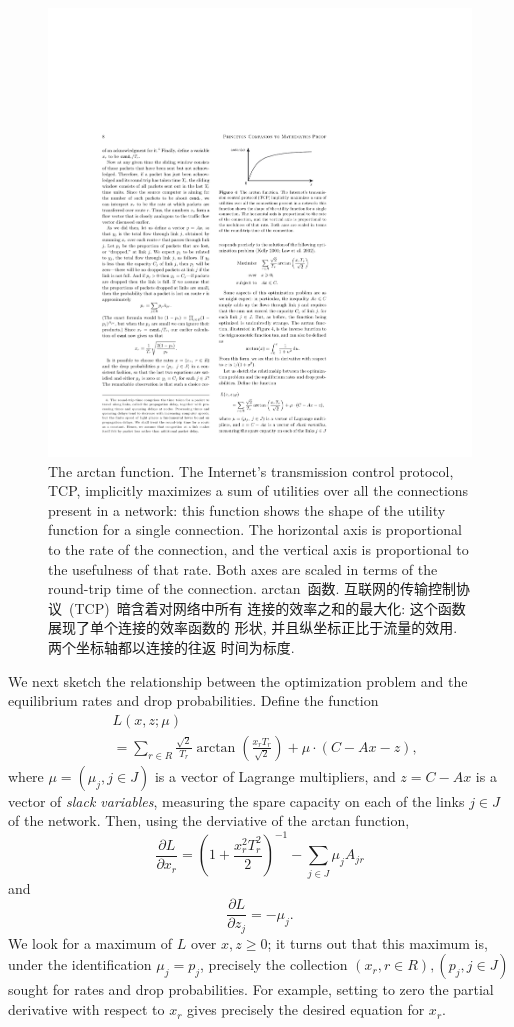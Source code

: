 \documentclass[a4paper,12pt, twocolumn]{article}
\begin{document}
\begin{figure}[ht]
\centering
\includegraphics{p4}
\caption{The arctan function.  The Internet's
transmission control protocol, TCP, implicitly maximizes
a sum of utilities over all the connections present in
a network: this function shows the shape
of the utility function for a single connection.
The horizontal axis is proportional to 
the rate of the connection, and  the vertical
axis is proportional to the usefulness of that rate.  Both axes are
scaled in terms of the round-trip time of the connection. 
arctan~函数. 互联网的传输控制协议~(TCP)~暗含着对网络中所有
连接的效率之和的最大化: 这个函数展现了单个连接的效率函数的
形状, 并且纵坐标正比于流量的效用. 两个坐标轴都以连接的往返
时间为标度. 
\label{Fig-pcm0052.4}}
\end{figure}

We next sketch the relationship between the 
optimization problem and the equilibrium rates and 
drop probabilities.  Define the function
\begin{align*}
&L(x,z  ; \mu )  \\
&=\sum_{r\in R} \frac{\sqrt{2} }{T_r}    
\arctan \left( \frac{x_r T_r}{\sqrt{2} } \right)
+\mu \cdot (C -Ax-z ),
\end{align*}
where $\mu = (\mu_j, j \in J)$ is a vector of Lagrange
multipliers, and $z = C- Ax$ is a vector of {\it slack variables},
measuring the spare capacity on each of the links $j \in J$ of
the network. Then, using the derviative of the arctan function,  
$${{\frac{\partial L}{\partial x_r}}} = 
 \left( 1 +
\frac{x_r^2T_r^2}{2} \right)^{-1} 
 -\sum_{j\in J}\mu_j A_{jr}
$$
and
$${{\frac{\partial L}{\partial z_j}}} = -\mu_j. $$
We look for a maximum of $L$ over $x, z \geq 0$;
it turns out that this maximum
is, under the identification $\mu_j = p_j$,
precisely the collection $(x_r, r \in R), (p_j, j \in J)$
sought for rates and drop probabilities. For example,
setting to zero the partial derivative with respect to $x_r$
gives precisely the desired equation for $x_r$.
\end{document}
